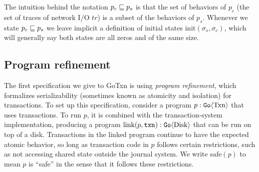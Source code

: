 The intuition behind the notation $p_{c} \sqsubseteq p_{s}$ is that the set of
behaviors of $p_{c}$ (the set of traces of network I/O $\textit{tr}$) is a subset of the
behaviors of $p_{s}$. Whenever we state $p_{c} \sqsubseteq p_{s}$ we leave implicit
a definition of initial states $\mathrm{init}(\sigma_{s}, \sigma_{c})$, which
will generally say both states are all zeros and of the same size.

\subsection{Program refinement}

The first specification we give to GoTxn is using \emph{program refinement},
which formalizes serializability (sometimes known as atomicity and isolation) for transactions.
To set up this specification, consider a program $p : \mathtt{Go}\langle \mathrm{Txn} \rangle$ that
uses transactions.
To run $p$, it is combined with the transaction-system implementation, producing
a program $\mathrm{link}(p, \texttt{txn}) : \mathtt{Go}\langle \mathrm{Disk} \rangle$ that can be run on
top of a disk.
Transactions in the linked program continue to have the expected atomic
behavior, so long as transaction code in $p$ follows certain restrictions, such
as not accessing shared state outside the journal system.  We write
$\mathrm{safe}(p)$ to mean $p$ is ``safe'' in the sense that it follows these restrictions.

%

